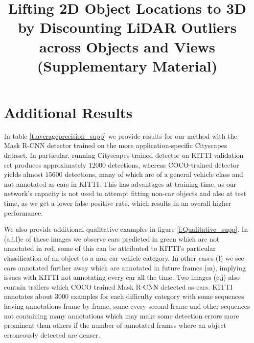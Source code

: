 \documentclass[]{article}
\title{Lifting 2D Object Locations to 3D by Discounting LiDAR Outliers across Objects and Views (Supplementary Material)}
\begin{document}


\section{Additional Results}
In table \ref{t:averageprecision_supp} we provide results for our method with the Mask R-CNN detector trained on the more application-specific Cityscapes\cite{cordts16the-cityscapes} dataset. In particular, running Cityscapes-trained detector on KITTI validation set produces approximately $12000$ detections, whereas COCO-trained detector yields almost $15600$ detections, many of which are of a general vehicle class and not annotated as cars in KITTI. This has advantages at training time, as our network's capacity is not used to attempt fitting non-car objects and also at test time, as we get a lower false positive rate, which results in an overall higher performance.

We also provide additional qualitative examples in figure \ref{f:Qualitative_supp}. In (a,i,l)e of these images we observe cars predicted in green which are not annotated in red, some of this can be attributed to KITTI's particular classification of an object to a non-car vehicle category. In other cases (l) we see cars annotated further away which are annotated in future frames (m), implying issues with KITTI not annotating every car all the time. Two images (c,j) also contain trailers which COCO trained Mask R-CNN detected as cars. KITTI annotates about 3000 examples for each difficulty category with some sequences having annotations frame by frame, some every second frame and other sequences not containing many annotations which may make some detection errors more prominent than others if the number of annotated frames where an object erroneously detected are denser.







{\small }
\end{document}
